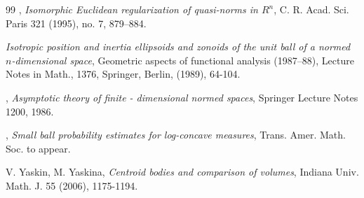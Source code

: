 \documentclass[12pt]{amsart} %
\renewcommand{\[}{\left[}
\renewcommand{\(}{\left(}
\renewcommand{\]}{\right]}
\renewcommand{\)}{\right)}
\begin{document}
\begin{thebibliography}{99}
, {\em Isomorphic Euclidean regularization of quasi-norms in $R^n$},  C. R. Acad. Sci. Paris   321  (1995),  no. 7, 879--884.

 {\em Isotropic position and
inertia ellipsoids and zonoids of the unit ball of a normed
$n$-dimensional
 space},  Geometric aspects of functional analysis (1987--88),
Lecture Notes in Math., 1376, Springer, Berlin, (1989), 64-104.


, {\em Asymptotic theory of
finite - dimensional normed spaces}, Springer Lecture Notes 1200,
1986.

, {\em Small ball probability estimates for log-concave measures}, Trans. Amer. Math. Soc. to appear.

 {\sc V. Yaskin,  M. Yaskina},  {\em Centroid bodies and comparison of volumes}, 
Indiana Univ. Math. J. 55 (2006), 1175-1194.





\end{thebibliography}
 
\end{document}
